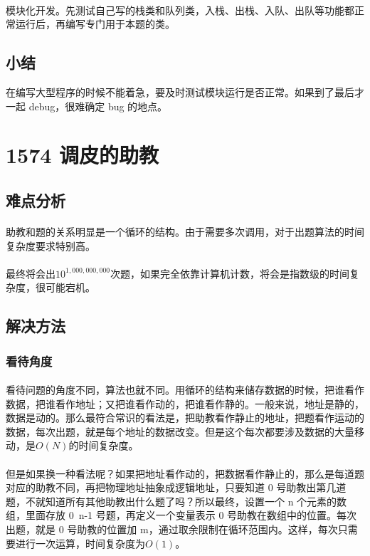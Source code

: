 \documentclass[UTF-8, 12pt]{ctexart}
\begin{document}
    \paragraph{}
    模块化开发。先测试自己写的栈类和队列类，入栈、出栈、入队、出队等功能都正常运行后，再编写专门用于本题的类。
    \subsection{小结}
    在编写大型程序的时候不能着急，要及时测试模块运行是否正常。如果到了最后才一起 debug，很难确定 bug 的地点。

\section{1574 调皮的助教}
    \subsection{难点分析}
    \paragraph{}
    助教和题的关系明显是一个循环的结构。由于需要多次调用，对于出题算法的时间复杂度要求特别高。
    \paragraph{}
    最终将会出$10^{1,000,000,000}$次题，如果完全依靠计算机计数，将会是指数级的时间复杂度，很可能宕机。
    \subsection{解决方法}
    	\subsubsection{看待角度}
    	\paragraph{}
    看待问题的角度不同，算法也就不同。用循环的结构来储存数据的时候，把谁看作数据，把谁看作地址；又把谁看作动的，把谁看作静的。一般来说，地址是静的，数据是动的。那么最符合常识的看法是，把助教看作静止的地址，把题看作运动的数据，每次出题，就是每个地址的数据改变。但是这个每次都要涉及数据的大量移动，是$O(N)$的时间复杂度。
    	\paragraph{}
    但是如果换一种看法呢？如果把地址看作动的，把数据看作静止的，那么是每道题对应的助教不同，再把物理地址抽象成逻辑地址，只要知道 0 号助教出第几道题，不就知道所有其他助教出什么题了吗？所以最终，设置一个 n 个元素的数组，里面存放 0~n-1 号题，再定义一个变量表示 0 号助教在数组中的位置。每次出题，就是 0 号助教的位置加 m，通过取余限制在循环范围内。这样，每次只需要进行一次运算，时间复杂度为$O(1)$。
\end{document}
